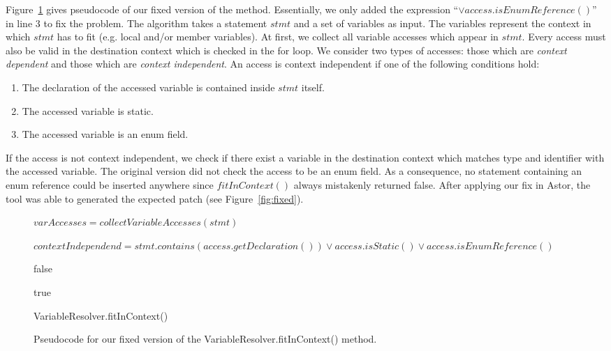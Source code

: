 \documentclass[pdftex,english,oribibl]{llncs}
\begin{document}
Figure~\ref{fig:fitInContext} gives pseudocode of our fixed version of the method.
Essentially, we only added the expression ``$\vee access.isEnumReference()$'' in line 3 to fix the problem.
The algorithm takes a statement $stmt$ and a set of variables as input.
The variables represent the context in which $stmt$ has to fit (e.g. local and/or member variables). At first, we collect all variable accesses which appear in $stmt$.
Every access must also be valid in the destination context which is checked in the for loop.
We consider two types of accesses: those which are \emph{context dependent} and those which are \emph{context independent}. 
An access is context independent if one of the following conditions hold:
\begin{enumerate}
	\item The declaration of the accessed variable is contained inside $stmt$ itself.
	\item The accessed variable is static.
	\item The accessed variable is an enum field.
\end{enumerate}
If the access is not context independent, we check if there exist a variable in the destination context which matches type and identifier with the accessed variable.
The original version did not check the access to be an enum field.
As a consequence, no statement containing an enum reference could be inserted anywhere since $fitInContext()$ always mistakenly returned false.
After applying our fix in Astor, the tool was able to generated the expected patch (see Figure~\ref{fig:fixed}).

\begin{figure}
	\centering
\begin{algorithm}[H]


$varAccesses = collectVariableAccesses(stmt)$\;

{
 $contextIndependend = stmt.contains(access.getDeclaration()) \vee access.isStatic() \vee access.isEnumReference()$ \;

 {
   \Return false\;
 }
}

\Return true\;

\caption{VariableResolver.fitInContext()}
\end{algorithm}
\caption{Pseudocode for our fixed version of the VariableResolver.fitInContext() method.}
\label{fig:fitInContext}
\end{figure}
\end{document}
